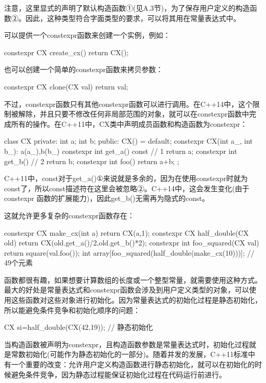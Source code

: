 注意，这里显式的声明了默认构造函数①(见A.3节)，为了保存用户定义的构造函数②。因此，这种类型符合字面类型的要求，可以将其用在常量表达式中。

可以提供一个constexpr函数来创建一个实例，例如：

\begin{cpp}
constexpr CX create_cx()
{
  return CX();
}
\end{cpp}

也可以创建一个简单的constexpr函数来拷贝参数：

\begin{cpp}
constexpr CX clone(CX val)
{
  return val;
}
\end{cpp}

不过，constexpr函数只有其他constexpr函数可以进行调用。在C++14中，这个限制被解除，并且只要不修改任何非局部范围的对象，就可以在constexpr函数中完成所有的操作。在C++11中，CX类中声明成员函数和构造函数为constexpr：

\begin{cpp}
class CX
{
private:
  int a;
  int b;
public:
  CX() = default;
  constexpr CX(int a_, int b_):
    a(a_),b(b_)
  {}
  constexpr int get_a() const  // 1
  {
    return a;
  }
  constexpr int get_b()  // 2
  {
    return b;
  }
  constexpr int foo()
  {
    return a+b;
  }
};
\end{cpp}

C++11中，const对于get\_a()①来说就是多余的，因为在使用constexpr时就为const了，所以const描述符在这里会被忽略②。C++14中，这会发生变化(由于constexpr 函数的扩展能力)，因此get\_b()无需再为隐式的const。

这就允许更多复杂的constexpr函数存在：

\begin{cpp}
constexpr CX make_cx(int a)
{
  return CX(a,1);
}
constexpr CX half_double(CX old)
{
  return CX(old.get_a()/2,old.get_b()*2);
}
constexpr int foo_squared(CX val)
{
  return square(val.foo());
}
int array[foo_squared(half_double(make_cx(10)))];  // 49个元素
\end{cpp}

函数都很有趣，如果想要计算数组的长度或一个整型常量，就需要使用这种方式。最大的好处是常量表达式和constexpr函数会涉及到用户定义类型的对象，可以使用这些函数对这些对象进行初始化。因为常量表达式的初始化过程是静态初始化，所以能避免条件竞争和初始化顺序的问题：

\begin{cpp}
CX si=half_double(CX(42,19));  // 静态初始化
\end{cpp}

当构造函数被声明为constexpr，且构造函数参数是常量表达式时，初始化过程就是常数初始化(可能作为静态初始化的一部分)。随着并发的发展，C++11标准中有一个重要的改变：允许用户定义构造函数进行静态初始化，就可以在初始化的时候避免条件竞争，因为静态过程能保证初始化过程在代码运行前进行。

